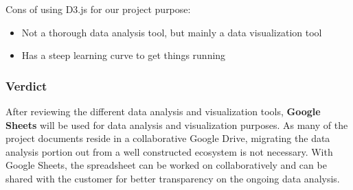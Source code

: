 \documentclass[10pt,journal,compsoc,draftclsnofoot]{IEEEtran}
\begin{document}
Cons of using D3.js for our project purpose:
\begin{itemize}
\item Not a thorough data analysis tool, but mainly a data visualization tool
\item Has a steep learning curve to get things running
\end{itemize}

\subsubsection{Verdict}
After reviewing the different data analysis and visualization tools, \textbf{Google Sheets} will be used for data analysis and visualization purposes.
As many of the project documents reside in a collaborative Google Drive, migrating the data analysis portion out from a well constructed ecosystem is not necessary.
With Google Sheets, the spreadsheet can be worked on collaboratively and can be shared with the customer for better transparency on the ongoing data analysis. 

\newpage



\end{document}
